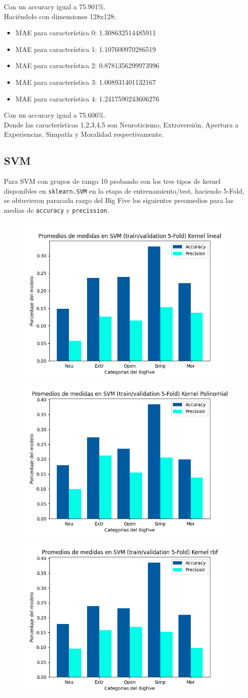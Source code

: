 \documentclass[10pt, a4paper]{article}
\begin{document}
                Con un accuracy igual a 75.901\%.\\

                Haci\'endolo con dimensiones 128x128:
                \begin{itemize}
                    \item[] MAE para caracter\'istica 0: 1.308632514485911
                    \item[] MAE para caracter\'istica 1: 1.107600970286519
                    \item[] MAE para caracter\'istica 2: 0.8781356299973996
                    \item[] MAE para caracter\'istica 3: 1.008931401132167
                    \item[] MAE para caracter\'istica 4: 1.2417590243606276
                \end{itemize}
                
                Con un accuracy igual a 75.606\%.\\
                
                Donde las caracter\'isticas 1,2,3,4,5 son Neuroticismo, Extroversi\'on, Apertura a Experiencias, 
                Simpat\'ia y Moralidad respectivamente.
            
            \subsection{SVM} 
            Para SVM con grupos de rango 10 probando con los tres tipos de kernel disponibles en \texttt{sklearn.SVM} en la etapa de 
            entrenamiento/test, haciendo 5-Fold, se obtuvieron paracada razgo del Big Five los siguientes preomedios para las medias de
            \texttt{accuracy} y \texttt{precission}.

            \begin{figure}[h!]
                \centering
                \includegraphics[width = 0.3\linewidth]{Medias_Lineal10.png}
                \includegraphics[width = 0.3\linewidth]{Medias_Polinomial10.png}
                \includegraphics[width = 0.3\linewidth]{Medias_rbf10.png}

            \end{figure}
\end{document}

